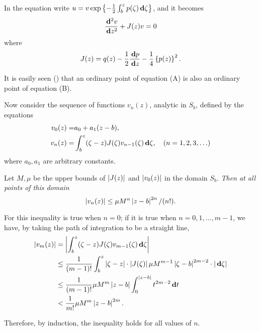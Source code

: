 In the equation write
$u = v \exp \left\{ 
  - \frac{1}{2} \int_{b}^{z} p(\zeta) \, \mathbf{d} \zeta
 \right\}$,
and it becomes
\begin{equation}
  \frac{\, \mathbf{d}^{2} v}{\, \mathbf{d} z^{2}}
  + J(z) v
  = 0
\end{equation}
where
$$
J(z)
=
q(z)
- \frac{1}{2} \frac{\, \mathbf{d} p}{\, \mathbf{d} z}
- \frac{1}{4} \left\{ p(z) \right\}^{2}.
$$
%
%

It is easily seen () that an ordinary point of equation (A) %
is also an ordinary point of equation (B). %

Now consider the sequence of functions $v_{n}(z)$, analytic in $S_{b}$,
defined by the equations
\begin{align*}
  v_{0}(z)
  =& a_{0} + a_{1} (z-b),
  \\
  v_{n}(z)
  =&
  \int_{b}^{z} (\zeta - z) J(\zeta) v_{n-1}(\zeta) \, \mathbf{d} \zeta,
  \quad
  (n=1,2,3,\ldots)
\end{align*}
where $a_{0}, a_{1}$ are arbitrary constants.

Let $M, \mu$ be the upper bounds of $\left| J(z) \right|$ and $\left| v_{0}(z) \right|$ in the domain
$S_{b}$. \emph{Then at all points of this domain}
$$
\left| v_{n}(z) \right|
\leq
\mu M^{n} \left| z-b \right|^{2n} / (n!).
$$

For this inequality is true when $n=0$; if it is true when $n=0,1,\ldots,m-1$,
we have, by taking the path of integration to be a straight
line,
\begin{align*}
  \left| v_{m}(z) \right|
  &=
  \left| 
    \int_{b}^{z} (\zeta-z) J(\zeta) v_{m-1}(\zeta) \, \mathbf{d} \zeta
   \right|
  \\
  &\leq
  \frac{1}{(m-1)!}
  \int_{b}^{z}
  \left| \zeta-z \right| \cdot \left| J(\zeta) \right|
  \mu M^{m-1}
  \left| \zeta-b \right|^{2m-2} \cdot \left| \, \mathbf{d} \zeta \right|
  \\
  &\leq
  \frac{1}{(m-1)!}
  \mu M^{m} \left| z-b \right|
  \int_{0}^{\left| z-b \right|} t^{2m-2} \, \mathbf{d} t
  \\
  &<
  \frac{1}{m!} \mu M^{m} \left| z - b \right|^{2m}.
\end{align*}

Therefore, by induction, the inequality holds for all values of $n$.

